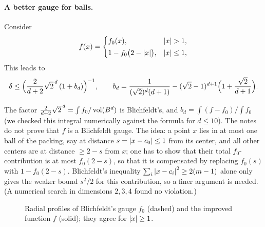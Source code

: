 \paragraph{A better gauge for balls.}
Consider
\[
  f(x)=\begin{cases} f_0(x), & \left\lvert x \right\rvert>1,\\[2pt] 1-f_0\bigl(2-\left\lvert x \right\rvert\bigr), & \left\lvert x \right\rvert\le1,\end{cases}
\]
This leads to
\[
  \delta\le\Bigl(\frac{2}{d+2}\sqrt2^{\,d}\,(1+b_d)\Bigr)^{-1},\qquad
  b_d=\frac{1}{(\sqrt2)^d(d+1)}-(\sqrt2-1)^{d+1}\Bigl(1+\frac{\sqrt2}{d+1}\Bigr).
\]
\begin{addedblock}
The factor $\frac{2}{d+2}\sqrt2^{\,d}=\int f_0/\operatorname{vol}(B^d)$ is Blichfeldt's, and $b_d=\int(f-f_0)\big/\int f_0$
(we checked this integral numerically against the formula for $d\le10$). The notes do not prove that $f$ is a Blichfeldt gauge.
The idea: a point $x$ lies in at most one ball of the packing, say at distance $s=\left\lvert x-c_0 \right\rvert\le1$ from its center, and all other centers
are at distance $\ge2-s$ from $x$; one has to show that their total $f_0$-contribution is at most $f_0(2-s)$, so that it is
compensated by replacing $f_0(s)$ with $1-f_0(2-s)$. Blichfeldt's inequality $\sum_i\left\lvert x-c_i \right\rvert^2\ge 2(m-1)$ alone only gives the weaker
bound $s^2/2$ for this contribution, so a finer argument is needed. (A numerical search in dimensions $2,3,4$ found no violation.)
\end{addedblock}

\begin{figure}[ht]
\centering
{}
\caption{Radial profiles of Blichfeldt's gauge $f_0$ (dashed) and the improved function $f$ (solid); they agree for $\left\lvert x \right\rvert\ge1$.}
\label{L3:fig:profiles}
\end{figure}

